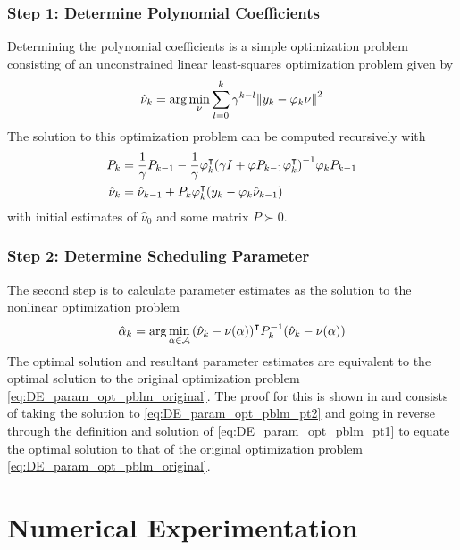 \documentclass[]{ieeetran}
\begin{document}
\subsubsection{Step 1: Determine Polynomial Coefficients}
Determining the polynomial coefficients is a simple optimization problem consisting of an unconstrained linear least-squares optimization problem given by
\begin{equation}\label{eq:DE_param_opt_pblm_pt1}
	\hat{\nu}_k = \arg \min_\nu \sum_{l=0}^k \gamma^{k-l} \norm{y_k - \varphi_k \nu}^2
\end{equation}
The solution to this optimization problem can be computed recursively with
\begin{subequations}\label{eq:DE_param_opt_pblm_pt1_soln}
	\begin{align}
		P_k &= \frac{1}{\gamma} P_{k-1} - \frac{1}{\gamma} \varphi_k^\intercal \qty(\gamma I + \varphi P_{k-1} \varphi_k^\intercal)^{-1} \varphi_k P_{k-1}\\
		\hat{\nu}_k &= \hat{\nu}_{k-1} + P_k \varphi_k^\intercal \qty(y_k - \varphi_k \hat{\nu}_{k-1})
	\end{align}
\end{subequations}
with initial estimates of $\hat{\nu}_0$ and some matrix $P\succ0$.

\subsubsection{Step 2: Determine Scheduling Parameter}
The second step is to calculate parameter estimates as the solution to the nonlinear optimization problem
\begin{equation}\label{eq:DE_param_opt_pblm_pt2}
	\hat{\alpha}_k = \arg \min_{\alpha\in\mathcal{A}} \qty(\hat{\nu}_k - \nu(\alpha))^\intercal P_k^{-1} \qty(\hat{\nu}_k - \nu(\alpha))
\end{equation}
The optimal solution and resultant parameter estimates are equivalent to the optimal solution to the original optimization problem \eqref{eq:DE_param_opt_pblm_original}. The proof for this is shown in \cite{beelen2017joint} and consists of taking the solution to \eqref{eq:DE_param_opt_pblm_pt2} and going in reverse through the definition and solution of \eqref{eq:DE_param_opt_pblm_pt1} to equate the optimal solution to that of the original optimization problem \eqref{eq:DE_param_opt_pblm_original}.



\section{Numerical Experimentation}
\end{document}
